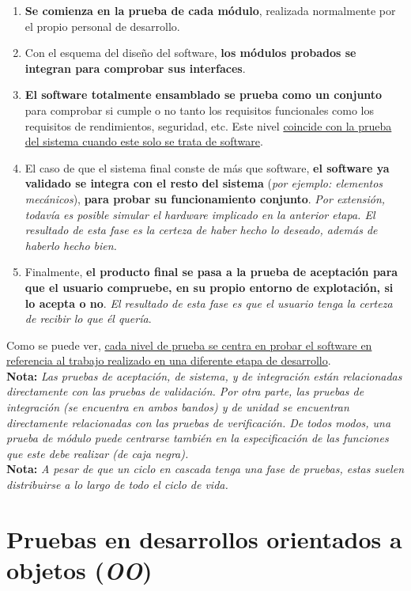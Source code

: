 \begin{enumerate}
    \item \textbf{Se comienza en la prueba de cada módulo}, realizada normalmente por el propio personal de desarrollo.
    \item Con el esquema del diseño del software, \textbf{los módulos probados se integran para comprobar sus interfaces}.
    \item \textbf{El software totalmente ensamblado se prueba como un conjunto} para comprobar si cumple o no tanto los requisitos funcionales como los requisitos de rendimientos, seguridad, etc. Este nivel \uline{coincide con la prueba del sistema cuando este solo se trata de software}.
    \item El caso de que el sistema final conste de más que software, \textbf{el software ya validado se integra con el resto del sistema} (\textit{por ejemplo: elementos mecánicos}), \textbf{para probar su funcionamiento conjunto}. \textit{Por extensión, todavía es posible simular el hardware implicado en la anterior etapa. El resultado de esta fase es la certeza de haber hecho lo deseado, además de haberlo hecho bien.}
    \item Finalmente, \textbf{el producto final se pasa a la prueba de aceptación para que el usuario compruebe, en su propio entorno de explotación, si lo acepta o no}. \textit{El resultado de esta fase es que el usuario tenga la certeza de recibir lo que él quería}.
\end{enumerate}

Como se puede ver, \uline{cada nivel de prueba se centra en probar el software en referencia al trabajo realizado en una diferente etapa de desarrollo}.\\

\textbf{Nota:} \textit{Las pruebas de aceptación, de sistema, y de integración están relacionadas directamente con las pruebas de validación. Por otra parte, las pruebas de integración (se encuentra en ambos bandos) y de unidad se encuentran directamente relacionadas con las pruebas de verificación. De todos modos, una prueba de módulo puede centrarse también en la especificación de las funciones que este debe realizar (de caja negra).}\\

\textbf{Nota:} \textit{A pesar de que un ciclo en cascada tenga una fase de pruebas, estas suelen distribuirse a lo largo de todo el ciclo de vida.}\\


\section{Pruebas en desarrollos orientados a objetos (\textit{OO})}

